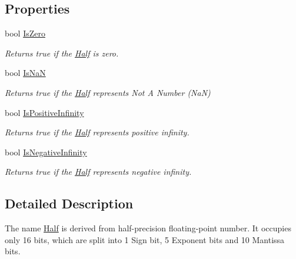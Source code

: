 \subsection*{Properties}
\begin{DoxyCompactItemize}
\item 
bool \hyperlink{struct_open_t_k_1_1_half_a48aeed7e4540b66deb01af091941a660}{Is\-Zero}
\begin{DoxyCompactList}\small\item\em Returns true if the \hyperlink{struct_open_t_k_1_1_half}{Half} is zero.\end{DoxyCompactList}\item 
bool \hyperlink{struct_open_t_k_1_1_half_a929c5a6b04acc0e21e106e35b0d296c2}{Is\-Na\-N}
\begin{DoxyCompactList}\small\item\em Returns true if the \hyperlink{struct_open_t_k_1_1_half}{Half} represents Not A Number (Na\-N)\end{DoxyCompactList}\item 
bool \hyperlink{struct_open_t_k_1_1_half_a080c67842958aca474f5aa85f2d7c658}{Is\-Positive\-Infinity}
\begin{DoxyCompactList}\small\item\em Returns true if the \hyperlink{struct_open_t_k_1_1_half}{Half} represents positive infinity.\end{DoxyCompactList}\item 
bool \hyperlink{struct_open_t_k_1_1_half_a89f7b3c1de64f30ffd030f63a868ddb3}{Is\-Negative\-Infinity}
\begin{DoxyCompactList}\small\item\em Returns true if the \hyperlink{struct_open_t_k_1_1_half}{Half} represents negative infinity.\end{DoxyCompactList}\end{DoxyCompactItemize}


\subsection{Detailed Description}
The name \hyperlink{struct_open_t_k_1_1_half}{Half} is derived from half-\/precision floating-\/point number. It occupies only 16 bits, which are split into 1 Sign bit, 5 Exponent bits and 10 Mantissa bits. 

